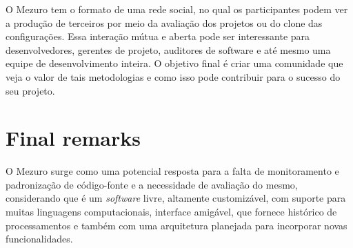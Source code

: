 \documentclass{llncs}
\begin{document}
O Mezuro tem o formato de uma rede social, no qual os participantes podem ver a
produção de terceiros por meio da avaliação dos projetos ou do clone das
configurações. Essa interação mútua e aberta pode ser interessante para
desenvolvedores, gerentes de projeto, auditores de software e até
mesmo uma equipe de desenvolvimento inteira. O objetivo final é criar uma
comunidade que veja o valor de tais metodologias e como isso pode contribuir
para o sucesso do seu projeto.

\section{Final remarks}

O Mezuro surge como uma potencial resposta para a falta de monitoramento e
padronização de código-fonte e a necessidade de avaliação do mesmo,
considerando que é um \textit{software} livre, altamente customizável, com
suporte para muitas linguagens computacionais, interface amigável, que fornece
histórico de processamentos e também com uma arquitetura planejada para
incorporar novas funcionalidades.




\end{document}
